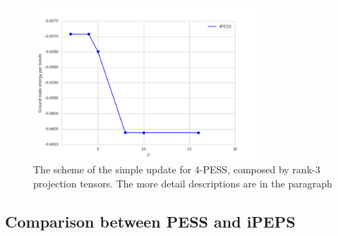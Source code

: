 \begin{figure}[H]
	\centering
	\includegraphics[width=0.75\textwidth]{figures/4pess_HeiGE.png}
	\caption[The scheme of the simple update for 4-PESS, composed by rank-3 projection tensors.]{The scheme of the simple update for 4-PESS, composed by rank-3 projection tensors. The more detail descriptions are in the paragraph}
	\label{fig4331}
\end{figure}

\subsection{Comparison between PESS and iPEPS}

